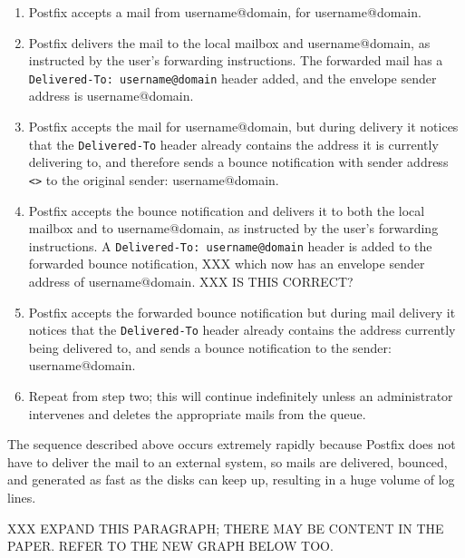 \begin{enumerate}

    \item Postfix accepts a mail from username@domain, for username@domain.

    \item Postfix delivers the mail to the local mailbox and
        username@domain, as instructed by the user's forwarding
        instructions. The forwarded mail has a
        \texttt{Delivered-To:~username@domain} header added, and the
        envelope sender address is username@domain.

    \item Postfix accepts the mail for username@domain, but during delivery
        it notices that the \texttt{Delivered-To} header already contains
        the address it is currently delivering to, and therefore sends a
        bounce notification with sender address \texttt{<>}\glsadd{<>} to
        the original sender: username@domain.

    \item Postfix accepts the bounce notification and delivers it to both
        the local mailbox and to username@domain, as instructed by the
        user's forwarding instructions.  A
        \texttt{Delivered-To:~username@domain} header is added to the
        forwarded bounce notification, XXX which now has an envelope sender
        address of username@domain.   XXX IS THIS CORRECT\@?

    \item Postfix accepts the forwarded bounce notification but during mail
        delivery it notices that the \texttt{Delivered-To} header already
        contains the address currently being delivered to, and sends a
        bounce notification to the sender: username@domain.

    \item Repeat from step two; this will continue indefinitely unless an
        administrator intervenes and deletes the appropriate mails from the
        queue.

\end{enumerate}

The sequence described above occurs extremely rapidly because Postfix does
not have to deliver the mail to an external system, so mails are delivered,
bounced, and generated as fast as the disks can keep up, resulting in a
huge volume of log lines.

XXX EXPAND THIS PARAGRAPH\@; THERE MAY BE CONTENT IN THE PAPER\@.  REFER TO
THE NEW GRAPH BELOW TOO\@.

